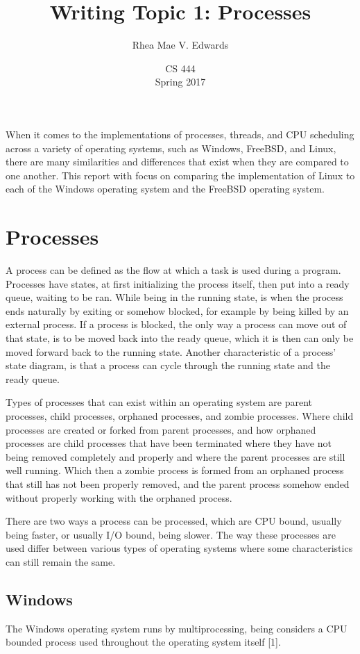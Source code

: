 \documentclass[letterpaper,10pt,onecolumn]{report}
\title{Writing Topic 1: Processes}
\author{Rhea Mae V. Edwards}
\date{CS 444 \\ Spring 2017}
\begin{document}
\maketitle

\noindent
When it comes to the implementations of processes, threads, and CPU scheduling across a variety of operating systems, such as Windows, FreeBSD, and Linux, there are many similarities and differences that exist when they are compared to one another. This report with focus on comparing the implementation of Linux to each of the Windows operating system and the FreeBSD operating system.

\section*{Processes}
A process can be defined as the flow at which a task is used during a program. Processes have states, at first initializing the process itself, then put into a ready queue, waiting to be ran. While being in the running state, is when the process ends naturally by exiting or somehow blocked, for example by being killed by an external process. If a process is blocked, the only way a process can move out of that state, is to be moved back into the ready queue, which it is then can only be moved forward back to the running state. Another characteristic of a process' state diagram, is that a process can cycle through the running state and the ready queue.
\par \noindent
Types of processes that can exist within an operating system are parent processes, child processes, orphaned processes, and zombie processes. Where child processes are created or forked from parent processes, and how orphaned processes are child processes that have been terminated where they have not being removed completely and properly and where the parent processes are still well running. Which then a zombie process is formed from an orphaned process that still has not been properly removed, and the parent process somehow ended without properly working with the orphaned process. 
\par \noindent
There are two ways a process can be processed, which are CPU bound, usually being faster, or usually I/O bound, being slower. 
The way these processes are used differ between various types of operating systems where some characteristics can still remain the same. 

	\subsection*{Windows}
	The Windows operating system runs by multiprocessing, being considers a CPU bounded process used throughout the operating system itself [1].
	
\end{document}
